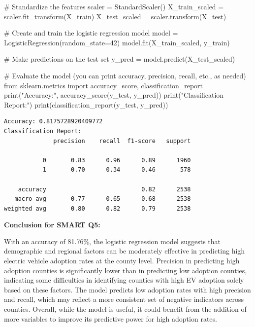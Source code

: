 \documentclass[
  letterpaper,
  DIV=11,
  numbers=noendperiod]{scrartcl}
\newenvironment{Shaded}{\begin{snugshade}}{\end{snugshade}}
\newcommand{\BuiltInTok}[1]{\textcolor[rgb]{0.00,0.23,0.31}{#1}}
\newcommand{\CommentTok}[1]{\textcolor[rgb]{0.37,0.37,0.37}{#1}}
\newcommand{\DecValTok}[1]{\textcolor[rgb]{0.68,0.00,0.00}{#1}}
\newcommand{\ImportTok}[1]{\textcolor[rgb]{0.00,0.46,0.62}{#1}}
\newcommand{\NormalTok}[1]{\textcolor[rgb]{0.00,0.23,0.31}{#1}}
\newcommand{\OperatorTok}[1]{\textcolor[rgb]{0.37,0.37,0.37}{#1}}
\newcommand{\StringTok}[1]{\textcolor[rgb]{0.13,0.47,0.30}{#1}}
\begin{document}
\begin{Shaded}
\begin{Highlighting}[]
\CommentTok{\# Standardize the features}
\NormalTok{scaler }\OperatorTok{=}\NormalTok{ StandardScaler()}
\NormalTok{X\_train\_scaled }\OperatorTok{=}\NormalTok{ scaler.fit\_transform(X\_train)}
\NormalTok{X\_test\_scaled }\OperatorTok{=}\NormalTok{ scaler.transform(X\_test)}

\CommentTok{\# Create and train the logistic regression model}
\NormalTok{model }\OperatorTok{=}\NormalTok{ LogisticRegression(random\_state}\OperatorTok{=}\DecValTok{42}\NormalTok{)}
\NormalTok{model.fit(X\_train\_scaled, y\_train)}

\CommentTok{\# Make predictions on the test set}
\NormalTok{y\_pred }\OperatorTok{=}\NormalTok{ model.predict(X\_test\_scaled)}

\CommentTok{\# Evaluate the model (you can print accuracy, precision, recall, etc., as needed)}
\ImportTok{from}\NormalTok{ sklearn.metrics }\ImportTok{import}\NormalTok{ accuracy\_score, classification\_report}
\BuiltInTok{print}\NormalTok{(}\StringTok{"Accuracy:"}\NormalTok{, accuracy\_score(y\_test, y\_pred))}
\BuiltInTok{print}\NormalTok{(}\StringTok{"Classification Report:"}\NormalTok{)}
\BuiltInTok{print}\NormalTok{(classification\_report(y\_test, y\_pred))}
\end{Highlighting}
\end{Shaded}

\begin{verbatim}
Accuracy: 0.8175728920409772
Classification Report:
              precision    recall  f1-score   support

           0       0.83      0.96      0.89      1960
           1       0.70      0.34      0.46       578

    accuracy                           0.82      2538
   macro avg       0.77      0.65      0.68      2538
weighted avg       0.80      0.82      0.79      2538
\end{verbatim}

\textbf{Conclusion for SMART Q5:}

With an accuracy of 81.76\%, the logistic regression model suggests that
demographic and regional factors can be moderately effective in
predicting high electric vehicle adoption rates at the county level.
Precision in predicting high adoption counties is significantly lower
than in predicting low adoption counties, indicating some difficulties
in identifying counties with high EV adoption solely based on these
factors. The model predicts low adoption rates with high precision and
recall, which may reflect a more consistent set of negative indicators
across counties. Overall, while the model is useful, it could benefit
from the addition of more variables to improve its predictive power for
high adoption rates.
\end{document}
